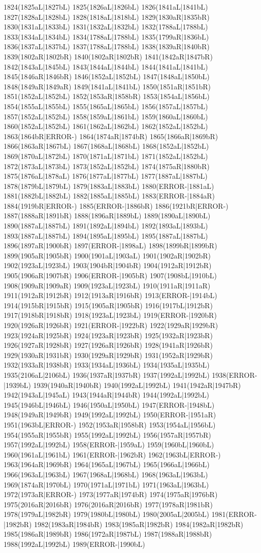 1824(1825aL|1827bL) 1825(1826aL|1826bL) 1826(1841aL|1841bL) 1827(1828aL|1828bL) 1828(1818aL|1818bL) 1829(1830aR|1835bR) 1830(1831aL|1833bL) 1831(1832aL|1832bL) 1832(1788aL|1788bL) 1833(1834aL|1834bL) 1834(1788aL|1788bL) 1835(1799aR|1836bL) 1836(1837aL|1837bL) 1837(1788aL|1788bL) 1838(1839aR|1840bR) 1839(1802aR|1802bR) 1840(1802aR|1802bR) 1841(1842aR|1847bR) 1842(1843aL|1845bL) 1843(1844aL|1844bL) 1844(1841aL|1841bL) 1845(1846aR|1846bR) 1846(1852aL|1852bL) 1847(1848aL|1850bL) 1848(1849aR|1849aR) 1849(1841aL|1841bL) 1850(1851aR|1851bR) 1851(1852aL|1852bL) 1852(1853aR|1858bR) 1853(1854aL|1856bL) 1854(1855aL|1855bL) 1855(1865aL|1865bL) 1856(1857aL|1857bL) 1857(1852aL|1852bL) 1858(1859aL|1861bL) 1859(1860aL|1860bL) 1860(1852aL|1852bL) 1861(1862aL|1862bL) 1862(1852aL|1852bL) 1863(1864bR|ERROR-) 1864(1874aR|1874bR) 1865(1866aR|1869bR) 1866(1863aR|1867bL) 1867(1868aL|1868bL) 1868(1852aL|1852bL) 1869(1870aL|1872bL) 1870(1871aL|1871bL) 1871(1852aL|1852bL) 1872(1873aL|1873bL) 1873(1852aL|1852bL) 1874(1875aR|1880bR) 1875(1876aL|1878aL) 1876(1877aL|1877bL) 1877(1887aL|1887bL) 1878(1879bL|1879bL) 1879(1883aL|1883bL) 1880(ERROR-|1881aL) 1881(1882bL|1882bL) 1882(1885aL|1885bL) 1883(ERROR-|1884aR) 1884(1919bR|ERROR-) 1885(ERROR-|1886bR) 1886(1921bR|ERROR-) 1887(1888aR|1891bR) 1888(1896aR|1889bL) 1889(1890aL|1890bL) 1890(1887aL|1887bL) 1891(1892aL|1894bL) 1892(1893aL|1893bL) 1893(1887aL|1887bL) 1894(1895aL|1895bL) 1895(1887aL|1887bL) 1896(1897aR|1900bR) 1897(ERROR-|1898aL) 1898(1899bR|1899bR) 1899(1905aR|1905bR) 1900(1901aL|1903aL) 1901(1902aR|1902bR) 1902(1923aL|1923bL) 1903(1904bR|1904bR) 1904(1912aR|1912bR) 1905(1906aR|1907bR) 1906(ERROR-|1905bR) 1907(1908bL|1910bL) 1908(1909aR|1909aR) 1909(1923aL|1923bL) 1910(1911aR|1911aR) 1911(1912aR|1912bR) 1912(1913aR|1916bR) 1913(ERROR-|1914bL) 1914(1915bR|1915bR) 1915(1905aR|1905bR) 1916(1917bL|1912bR) 1917(1918bR|1918bR) 1918(1923aL|1923bL) 1919(ERROR-|1920bR) 1920(1926aR|1926bR) 1921(ERROR-|1922bR) 1922(1929aR|1929bR) 1923(1924aR|1925bR) 1924(1923aR|1923bR) 1925(1932aR|1923bR) 1926(1927aR|1928bR) 1927(1926aR|1926bR) 1928(1941aR|1926bR) 1929(1930aR|1931bR) 1930(1929aR|1929bR) 1931(1952aR|1929bR) 1932(1933aR|1938bR) 1933(1934aL|1936bL) 1934(1935aL|1935bL) 1935(2106aL|2106bL) 1936(1937aR|1937bR) 1937(1992aL|1992bL) 1938(ERROR-|1939bL) 1939(1940aR|1940bR) 1940(1992aL|1992bL) 1941(1942aR|1947bR) 1942(1943aL|1945aL) 1943(1944aR|1944bR) 1944(1992aL|1992bL) 1945(1946bL|1946bL) 1946(1950aL|1950bL) 1947(ERROR-|1948bL) 1948(1949aR|1949bR) 1949(1992aL|1992bL) 1950(ERROR-|1951aR) 1951(1963bL|ERROR-) 1952(1953aR|1958bR) 1953(1954aL|1956bL) 1954(1955aR|1955bR) 1955(1992aL|1992bL) 1956(1957aR|1957bR) 1957(1992aL|1992bL) 1958(ERROR-|1959aL) 1959(1960bL|1960bL) 1960(1961aL|1961bL) 1961(ERROR-|1962bR) 1962(1963bL|ERROR-) 1963(1964aR|1969bR) 1964(1965aL|1967bL) 1965(1966aL|1966bL) 1966(1963aL|1963bL) 1967(1968aL|1968bL) 1968(1963aL|1963bL) 1969(1874aR|1970bL) 1970(1971aL|1971bL) 1971(1963aL|1963bL) 1972(1973aR|ERROR-) 1973(1977aR|1974bR) 1974(1975aR|1976bR) 1975(2016aR|2016bR) 1976(2016aR|2016bR) 1977(1978aR|1981bR) 1978(1979aL|1982bR) 1979(1980bL|1980bL) 1980(2005aL|2005bL) 1981(ERROR-|1982bR) 1982(1983aR|1984bR) 1983(1985aR|1982bR) 1984(1982aR|1982bR) 1985(1986aR|1989bR) 1986(1972aR|1987bL) 1987(1988aR|1988bR) 1988(1992aL|1992bL) 1989(ERROR-|1990bL) 